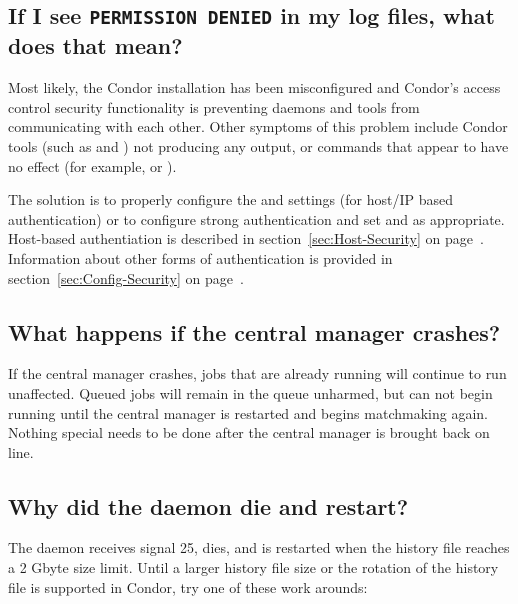 \subsection*{If I see \texttt{PERMISSION DENIED} in my log files,
what does that mean?}

Most likely, the Condor installation has been misconfigured
and Condor's access control security functionality is preventing
daemons and tools from communicating with each other.
Other symptoms of this problem include Condor tools (such as
 and ) not producing any output, or commands
that appear to have no effect (for example,  or
). 

The solution is to properly configure the  and
 settings (for host/IP based authentication) or to
configure strong authentication and set  and
 as appropriate.
Host-based authentiation is described in
section~\ref{sec:Host-Security} on page~\pageref{sec:Host-Security}.
Information about other forms of authentication is provided in 
section~\ref{sec:Config-Security} on page~\pageref{sec:Config-Security}.


\subsection*{What happens if the central manager crashes?}

If the central manager crashes, jobs that are already running will
continue to run unaffected.
Queued jobs will remain in the queue unharmed, but can not begin
running until the central manager is restarted and begins matchmaking
again.
Nothing special needs to be done after the central manager is brought
back on line.

\subsection*{Why did the  daemon die and restart?}

The  daemon receives signal 25,
dies, and is restarted when the
history file reaches a 2 Gbyte size limit.
Until a larger history file size or the rotation of the history
file is supported in Condor,
try one of these work arounds:

